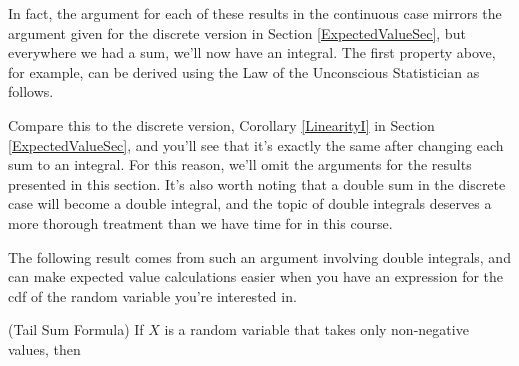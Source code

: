 In fact, the argument for each of these results in the continuous case mirrors the argument given for the discrete version in Section \ref{ExpectedValueSec}, but everywhere we had a sum, we'll now have an integral. The first property above, for example, can be derived using the Law of the Unconscious Statistician as follows.
\par
Compare this to the discrete version, Corollary \ref{LinearityI} in Section \ref{ExpectedValueSec}, and you'll see that it's exactly the same after changing each sum to an integral. For this reason, we'll omit the arguments for the results presented in this section. It's also worth noting that a double sum in the discrete case will become a double integral, and the topic of double integrals deserves a more thorough treatment than we have time for in this course.
\par
The following result comes from such an argument involving double integrals, and can make expected value calculations easier when you have an expression for the cdf of the random variable you're interested in.

\begin{prop}\label{Tail Sum Formula}(Tail Sum Formula) If $X$ is a random variable that takes only non-negative values, then
\end{prop}

